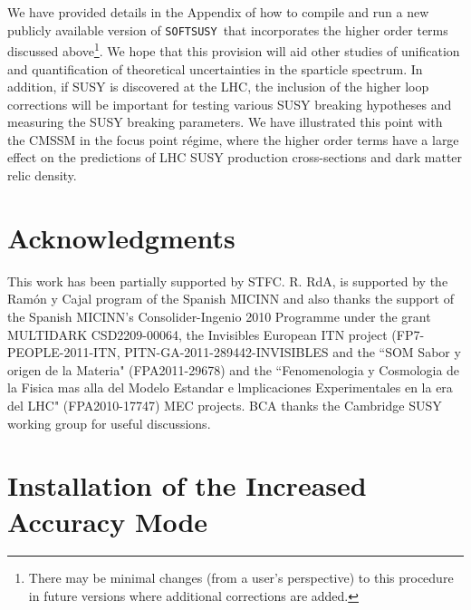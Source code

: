 \documentclass[final,3p,times,pdflatex]{elsarticle}
\begin{document}
 We have provided details in the Appendix of how to compile and run a new
 publicly available version of {\tt    SOFTSUSY}~that incorporates the higher
 order terms discussed above\footnote{There may be minimal changes (from a
   user's 
 perspective) to this procedure in future versions where additional
 corrections are added.}. We hope that this provision will aid other studies of
 unification and quantification of theoretical uncertainties in the sparticle
 spectrum. In addition, if SUSY is discovered at the LHC, the inclusion of the
 higher loop corrections will be important for testing various SUSY breaking
 hypotheses and measuring the SUSY breaking parameters. 
 We have illustrated this point with the CMSSM in the focus point r\'{e}gime,
 where the higher order terms have a large effect on the predictions of LHC
 SUSY production cross-sections and dark matter relic density.

\section*{Acknowledgments}
This work has been partially supported by STFC. R. RdA, is supported by the
Ram\'on y Cajal program of the Spanish MICINN and also thanks the support of
the Spanish MICINN's Consolider-Ingenio 2010 Programme under the grant
MULTIDARK CSD2209-00064, the Invisibles European ITN project
(FP7-PEOPLE-2011-ITN, PITN-GA-2011-289442-INVISIBLES and the ``SOM Sabor y
origen de la Materia" (FPA2011-29678) and the ``Fenomenologia y Cosmologia de
la Fisica mas alla del Modelo Estandar e lmplicaciones Experimentales en la
era del LHC" (FPA2010-17747) MEC projects. BCA thanks the Cambridge SUSY
working group for useful discussions. 

\appendix

\section{Installation of the Increased Accuracy Mode}
\label{sec:install}
\end{document}
